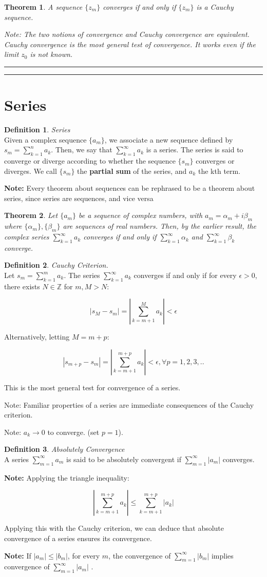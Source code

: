 \documentclass{article}
\newtheorem{theorem}{Theorem}[section]
\theoremstyle{definition}
\newtheorem{definition}{Definition}[section]
\newcommand{\Section}[1]{\hrule\hrule\section{#1}}
\newcommand{\Def}[2]{
\begin{shaded*}
\begin{definition}{\textit{#1}}\\#2\end{definition}
\end{shaded*}
}
\begin{document}
\begin{theorem}
A sequence $\{z_m\}$ converges if and only if $\{z_m\}$ is a Cauchy sequence. 

Note: The two notions of convergence and Cauchy convergence are equivalent. Cauchy convergence is the most general test of convergence. It works even if the limit $z_0$ is not known.
\end{theorem}

\Section{Series}
\Def{Series}{Given a complex sequence $\{a_m\}$, we associate a new sequence defined by $s_m = \sum_{k=1}^{n}a_k$. Then, we say that $\sum_{k=1}^{\infty}a_k$ is a series. The series is said to converge or diverge according to whether the sequence $\{s_m\}$ converges or diverges. We call $\{s_m\}$ the \textbf{partial sum} of the series, and $a_k$ the kth term.

\textbf{Note:} Every theorem about sequences can be rephrased to be a theorem about series, since series are sequences, and vice versa
}
\begin{theorem}
Let $\{a_m\}$ be a sequence of complex numbers, with $a_m = \alpha_m+ i \beta_m$ where $\{\alpha_m\}, \{\beta_m\}$ are sequences of real numbers. Then, by the earlier result, the complex series $\sum_{k=1}^{\infty}a_k$ converges if and only if $\sum_{k=1}^{\infty}\alpha_k$ and $\sum_{k=1}^{\infty}\beta_k$ converge.
\end{theorem}


\Def{Cauchy Criterion.}{Let $s_m = \sum_{k=1}^{m}a_k$. The series $\sum_{k=1}^{\infty}a_k$ converges if and only if for every $\epsilon>0$, there exists $N \in \mathbb{Z}$ for $m, M>N$:

$$|s_M - s_m| = \left|\sum_{k=m+1}^{M}a_k\right| < \epsilon$$

Alternatively, letting $M = m+p$:

$$|s_{m+p} - s_m| = \left|\sum_{k=m+1}^{m+p}a_k\right| < \epsilon, \forall p = 1,2,3,..$$

This is the most general test for convergence of a series. 

Note: Familiar properties of a series are immediate consequences of the Cauchy criterion.

Note: $a_k \to 0$ to converge. (set $p=1$).
 }

\Def{Absolutely Convergence}{A series $\sum_{m=1}^{\infty}a_m$ is said to be absolutely convergent if $\sum_{m=1}^{\infty}|a_m|$ converges. 

\textbf{Note:} Applying the triangle inequality:

$$\left|\sum_{k=m+1}^{m+p}a_k\right| \leq \sum_{k=m+1}^{m+p}\left|a_k\right|$$

Applying this with the Cauchy criterion, we can deduce that absolute convergence of a series ensures its convergence. 

\textbf{Note:} If $|a_m| \leq |b_m|$, for every $m$, the convergence of $\sum_{m=1}^{\infty} |b_m|$ implies convergence of $\sum_{m=1}^{\infty} |a_m|$ .
}
\end{document}
